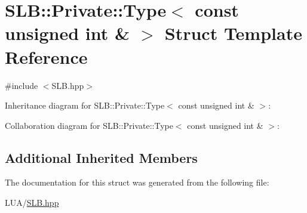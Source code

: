 \hypertarget{structSLB_1_1Private_1_1Type_3_01const_01unsigned_01int_01_6_01_4}{}\section{S\+LB\+:\+:Private\+:\+:Type$<$ const unsigned int \& $>$ Struct Template Reference}
\label{structSLB_1_1Private_1_1Type_3_01const_01unsigned_01int_01_6_01_4}


{\ttfamily \#include $<$S\+L\+B.\+hpp$>$}



Inheritance diagram for S\+LB\+:\+:Private\+:\+:Type$<$ const unsigned int \& $>$\+:


Collaboration diagram for S\+LB\+:\+:Private\+:\+:Type$<$ const unsigned int \& $>$\+:
\subsection*{Additional Inherited Members}


The documentation for this struct was generated from the following file\+:\begin{DoxyCompactItemize}
\item 
L\+U\+A/\hyperlink{SLB_8hpp}{S\+L\+B.\+hpp}\end{DoxyCompactItemize}
